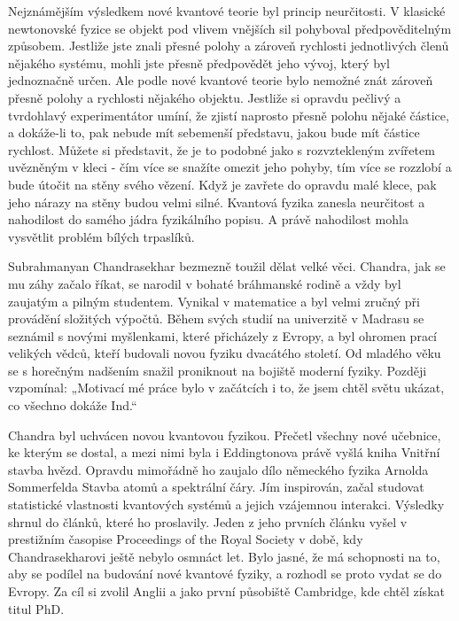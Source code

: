   Nejznámějším výsledkem nové kvantové teorie byl princip neurčitosti. V klasické newtonovské fyzice
  se objekt pod vlivem vnějších sil pohyboval předpověditelným způsobem. Jestliže jste znali přesné
  polohy a zároveň rychlosti jednotlivých členů nějakého systému, mohli jste přesně předpovědět jeho
  vývoj, který byl jednoznačně určen. Ale podle nové kvantové teorie bylo nemožné znát zároveň
  přesně polohy a rychlosti nějakého objektu. Jestliže si opravdu pečlivý a tvrdohlavý
  experimentátor umíní, že zjistí naprosto přesně polohu nějaké částice, a dokáže-li to, pak nebude
  mít sebemenší představu, jakou bude mít částice rychlost. Můžete si představit, že je to podobné
  jako s rozvztekleným zvířetem uvězněným v kleci - čím více se snažíte omezit jeho pohyby, tím více
  se rozzlobí a bude útočit na stěny svého vězení. Když je zavřete do opravdu malé klece, pak jeho
  nárazy na stěny budou velmi silné. Kvantová fyzika zanesla neurčitost a nahodilost do samého jádra
  fyzikálního popisu. A právě nahodilost mohla vysvětlit problém bílých trpaslíků. 
  
  Subrahmanyan Chandrasekhar bezmezně toužil dělat velké věci. Chandra, jak se mu záhy začalo říkat,
  se narodil v bohaté bráhmanské rodině a vždy byl zaujatým a pilným studentem. Vynikal v matematice
  a byl velmi zručný při provádění složitých výpočtů. Během svých studií na univerzitě v Madrasu se
  seznámil s novými myšlenkami, které přicházely z Evropy, a byl ohromen prací velikých vědců, kteří
  budovali novou fyziku dvacátého století. Od mladého věku se s horečným nadšením snažil proniknout
  na bojiště moderní fyziky. Později vzpomínal: „Motivací mé práce bylo v začátcích i to, že jsem
  chtěl světu ukázat, co všechno dokáže Ind.“
  
  Chandra byl uchvácen novou kvantovou fyzikou. Přečetl všechny nové učebnice, ke kterým se dostal,
  a mezi nimi byla i Eddingtonova právě vyšlá kniha Vnitřní stavba hvězd. Opravdu mimořádně ho
  zaujalo dílo německého fyzika Arnolda Sommerfelda Stavba atomů a spektrální čáry. Jím inspirován,
  začal studovat statistické vlastnosti kvantových systémů a jejich vzájemnou interakci. Výsledky
  shrnul do článků, které ho proslavily. Jeden z jeho prvních článku vyšel v prestižním časopise
  Proceedings of the Royal Society v době, kdy Chandrasekharovi ještě nebylo osmnáct let. Bylo
  jasné, že má schopnosti na to, aby se podílel na budování nové kvantové fyziky, a rozhodl se proto
  vydat se do Evropy. Za cíl si zvolil Anglii a jako první působiště Cambridge, kde chtěl získat
  titul PhD. 
  
